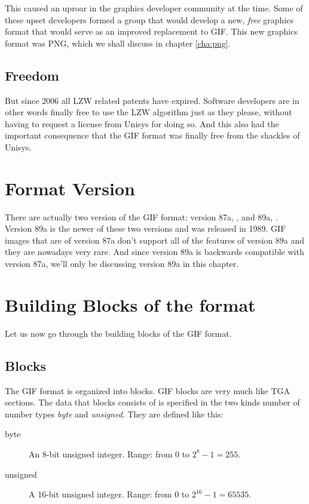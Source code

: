 This caused an uproar in the graphics developer community at the
time. Some of these upset developers formed a group that would develop
a new, \textit{free} graphics format that would serve as an improved
replacement to GIF. This new graphics format was PNG, which we shall
discuss in chapter \ref{cha:png}.

\subsection{Freedom}

But since 2006 all LZW related patents have expired. Software
developers are in other words finally free to use the LZW algorithm
just as they please, without having to request a license from Unisys
for doing so. And this also had the important consequence that the GIF
format was finally free from the shackles of Unisys.

\section{Format Version}

There are actually two version of the GIF format: version 87a,
\cite{gif87a}, and 89a, \cite{gif89a}. Version 89a is the newer of
these two versions and was released in 1989. GIF images that are of
version 87a don't support all of the features of version 89a and they
are nowadays very rare. And since version 89a is backwards compatible
with version 87a, we'll only be discussing version 89a in this
chapter.

\section{Building Blocks of the format}

Let us now go through the building blocks of the GIF format.

\subsection{Blocks}

The GIF format is organized into blocks. GIF blocks are very much like
TGA sections. The data that blocks consists of is specified in the two
kinds number of number types \textit{byte} and \textit{unsigned}. They
are defined like this:

\begin{description}
\item[byte] An 8-bit unsigned integer. Range: from 0 to $2^8 - 1 = 255$.
\item[unsigned] A 16-bit unsigned integer. Range: from 0 to $2^{16} -
  1 = 65535$.
\end{description}

